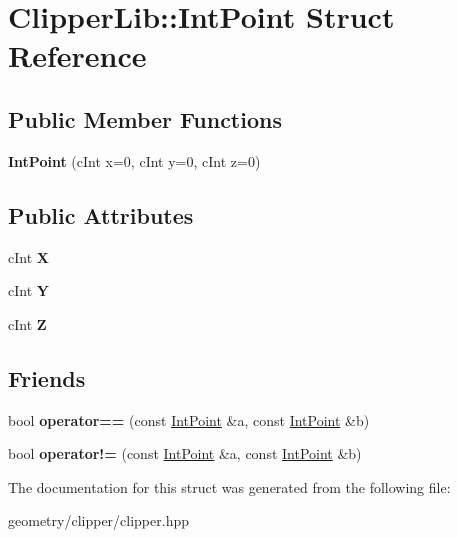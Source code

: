 \hypertarget{struct_clipper_lib_1_1_int_point}{}\section{Clipper\+Lib\+:\+:Int\+Point Struct Reference}
\label{struct_clipper_lib_1_1_int_point}
\subsection*{Public Member Functions}
\begin{DoxyCompactItemize}
\item 
\mbox{\label{struct_clipper_lib_1_1_int_point_aa43aba31684a398962bee5a56d6d378a}} 
{\bfseries Int\+Point} (c\+Int x=0, c\+Int y=0, c\+Int z=0)
\end{DoxyCompactItemize}
\subsection*{Public Attributes}
\begin{DoxyCompactItemize}
\item 
\mbox{\label{struct_clipper_lib_1_1_int_point_a608d16d39c8762e6c3c0a688efb310b6}} 
c\+Int {\bfseries X}
\item 
\mbox{\label{struct_clipper_lib_1_1_int_point_a8445d190cd9013bb34d49b5a8a240425}} 
c\+Int {\bfseries Y}
\item 
\mbox{\label{struct_clipper_lib_1_1_int_point_a9194e50a264eefb93cfcf5a16f882e9e}} 
c\+Int {\bfseries Z}
\end{DoxyCompactItemize}
\subsection*{Friends}
\begin{DoxyCompactItemize}
\item 
\mbox{\label{struct_clipper_lib_1_1_int_point_a6afef09ee09723a387e3046287e2635b}} 
bool {\bfseries operator==} (const \mbox{\hyperlink{struct_clipper_lib_1_1_int_point}{Int\+Point}} \&a, const \mbox{\hyperlink{struct_clipper_lib_1_1_int_point}{Int\+Point}} \&b)
\item 
\mbox{\label{struct_clipper_lib_1_1_int_point_aa37b2afb6cbc44cb9cd13ecc009decfb}} 
bool {\bfseries operator!=} (const \mbox{\hyperlink{struct_clipper_lib_1_1_int_point}{Int\+Point}} \&a, const \mbox{\hyperlink{struct_clipper_lib_1_1_int_point}{Int\+Point}} \&b)
\end{DoxyCompactItemize}


The documentation for this struct was generated from the following file\+:\begin{DoxyCompactItemize}
\item 
geometry/clipper/clipper.\+hpp\end{DoxyCompactItemize}
